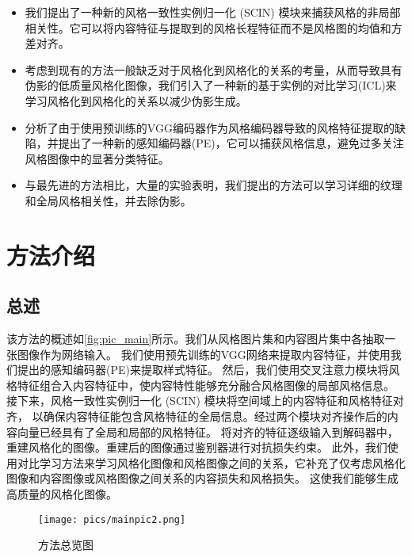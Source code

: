 \begin{itemize}
    \item 我们提出了一种新的风格一致性实例归一化 (SCIN) 模块来捕获风格的非局部相关性。它可以将内容特征与提取到的风格长程特征而不是风格图的均值和方差对齐。
    \item 考虑到现有的方法一般缺乏对于风格化到风格化的关系的考量，从而导致具有伪影的低质量风格化图像，我们引入了一种新的基于实例的对比学习(ICL)来学习风格化到风格化的关系以减少伪影生成。
    \item 分析了由于使用预训练的VGG编码器作为风格编码器导致的风格特征提取的缺陷，并提出了一种新的感知编码器(PE)，它可以捕获风格信息，避免过多关注风格图像中的显著分类特征。
    \item 与最先进的方法相比，大量的实验表明，我们提出的方法可以学习详细的纹理和全局风格相关性，并去除伪影。
\end{itemize}

\section{方法介绍}
\subsection{总述}
\par 该方法的概述如\autoref{fig:pic_main}所示。我们从风格图片集和内容图片集中各抽取一张图像作为网络输入。
我们使用预先训练的VGG网络来提取内容特征，并使用我们提出的感知编码器(PE)来提取样式特征。
然后，我们使用交叉注意力模块将风格特征组合入内容特征中，使内容特性能够充分融合风格图像的局部风格信息。
接下来，风格一致性实例归一化 (SCIN) 模块将空间域上的内容特征和风格特征对齐，
以确保内容特征能包含风格特征的全局信息。经过两个模块对齐操作后的内容向量已经具有了全局和局部的风格特征。
将对齐的特征逐级输入到解码器中，重建风格化的图像。重建后的图像通过鉴别器进行对抗损失约束。
此外，我们使用对比学习方法来学习风格化图像和风格图像之间的关系，它补充了仅考虑风格化图像和内容图像或风格图像之间关系的内容损失和风格损失。
这使我们能够生成高质量的风格化图像。
\begin{figure}[htbp]
    \centering
    \texttt{[image: pics/mainpic2.png]}
    \caption{\label{fig:pic_main}方法总览图}
\end{figure}
